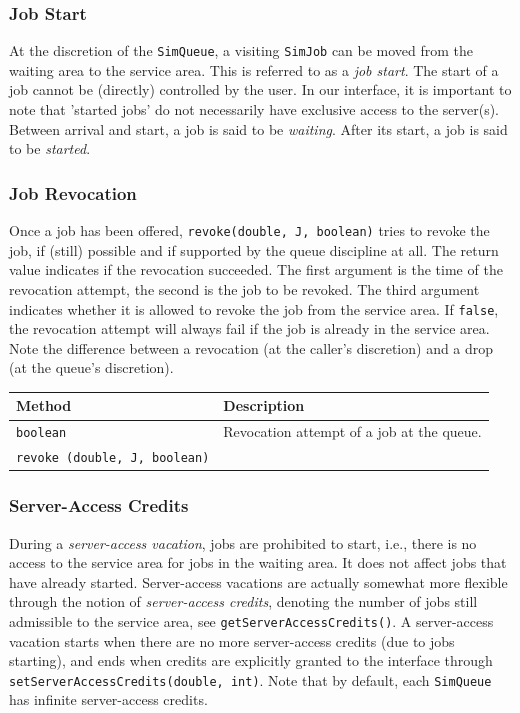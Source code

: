 \documentclass[12pt]{book}
\begin{document}
\subsubsection{Job Start}

At the discretion of the \lstinline-SimQueue-,
  a visiting \lstinline-SimJob- can be moved from
  the waiting area to the service area.
This is referred to as a {\em job start}.
The start of a job cannot be (directly) controlled by the user.
In our interface, it is important to note that 'started jobs'
  do not necessarily have exclusive access to the server(s).
Between arrival and start, a job is said to be {\em waiting}.
After its start, a job is said to be {\em started}.

\subsubsection{Job Revocation}

Once a job has been offered,
  \lstinline|revoke(double, J, boolean)|
  tries to revoke the job,
  if (still) possible
  and if supported by the queue discipline at all.
The return value indicates if the revocation succeeded.
The first argument is the time of the revocation attempt,
  the second is the job to be revoked.
The third argument indicates whether it is allowed to
  revoke the job from the service area.
If \lstinline|false|, the revocation attempt will always fail
  if the job is already in the service area.
Note the difference between
  a revocation (at the caller's discretion)
  and a drop (at the queue's discretion).

\begin{tabular}{|l|l|}
  \hline
  {\bf Method} & {\bf Description} \\
  \hline
  \lstinline[basicstyle=\footnotesize]!boolean!
    & Revocation attempt of a job at the queue.
    \\
  \lstinline[basicstyle=\footnotesize]!revoke (double, J, boolean)!
    &
    \\ \hline
\end{tabular}

\subsubsection{Server-Access Credits}

During a {\em server-access vacation},
  jobs are prohibited to start,
  i.e.,
  there is no access to the service area for jobs in the waiting area.
It does not affect jobs that have already started.
Server-access vacations are actually
  somewhat more flexible through the notion of {\em server-access credits},
  denoting the number of jobs still admissible to the service area,
  see \lstinline|getServerAccessCredits()|.
A server-access vacation starts
  when there are no more server-access credits (due to jobs starting),
  and ends when credits are explicitly granted to the interface through
  \lstinline|setServerAccessCredits(double, int)|.
Note that by default, each \lstinline|SimQueue| has infinite server-access credits.
\end{document}

